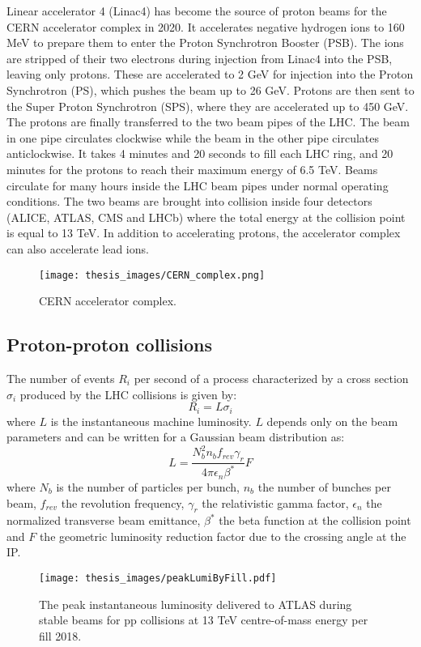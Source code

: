 \documentclass[a4paper, oneside, 11pt, openright]{book}
\begin{document}
				Linear accelerator 4 (Linac4) has become the source of proton beams for the CERN accelerator complex in 2020. It accelerates negative hydrogen ions to 160 MeV to prepare them to enter the Proton Synchrotron Booster (PSB). The ions are stripped of their two electrons during injection from Linac4 into the PSB, leaving only protons. These are accelerated to 2 GeV for injection into the Proton Synchrotron (PS), which pushes the beam up to 26 GeV. Protons are then sent to the Super Proton Synchrotron (SPS), where they are accelerated up to 450 GeV. The protons are finally transferred to the two beam pipes of the LHC. The beam in one pipe circulates clockwise while the beam in the other pipe circulates anticlockwise. It takes 4 minutes and 20 seconds to fill each LHC ring, and 20 minutes for the protons to reach their maximum energy of 6.5 TeV. Beams circulate for many hours inside the LHC beam pipes under normal operating conditions. The two beams are brought into collision inside four detectors (ALICE, ATLAS, CMS and LHCb) where the total energy at the collision point is equal to 13 TeV. In addition to accelerating protons, the accelerator complex can also accelerate lead ions.
				
				\begin{figure}
					\centering
					\texttt{[image: thesis\_images/CERN\_complex.png]}
					\caption{CERN accelerator complex.}
					\label{fig:CERN_complex}
				\end{figure}
			
			\subsection{Proton-proton collisions}
				The number of events $R_{i}$ per second of a process characterized by a cross section $\sigma_{i}$ produced by the LHC collisions is given by:
				$$
				R_{i} = L\sigma_{i}
				$$
				where $L$ is the instantaneous machine luminosity. $L$ depends only on the beam parameters and can be written for a Gaussian beam distribution as: 
				$$
				L = \frac{N_b^2n_bf_{rev}\gamma_r}{4\pi\epsilon_n\beta^*}F
				$$
				where $N_b$ is the number of particles per bunch, $n_b$ the number of bunches per beam, $f_{rev}$ the revolution frequency, $\gamma_r$ the relativistic gamma factor, $\epsilon_n$ the normalized transverse beam emittance, $\beta^*$ the beta function at the collision point and $F$ the geometric luminosity reduction factor due to the crossing angle at the IP. 
				
				\begin{figure}
					\centering
					\texttt{[image: thesis\_images/peakLumiByFill.pdf]}
					\caption{The peak instantaneous luminosity delivered to ATLAS during stable beams for pp collisions at 13 TeV centre-of-mass energy per fill 2018.}
					\label{fig:insta lum}
				\end{figure}
				
\end{document}
